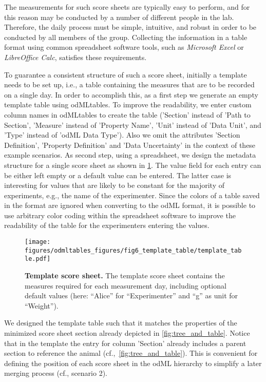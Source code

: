 The measurements for such score sheets are typically easy to perform, and for this reason may be conducted by a number of different people in the lab. Therefore, the daily process must be simple, intuitive, and robust in order to be conducted by all members of the group. Collecting the information in a table format using common spreadsheet software tools, such as \textit{Microsoft Excel} or \textit{LibreOffice Calc}, satisfies these requirements. 

To guarantee a consistent structure of such a score sheet, initially a template needs to be set up, i.e., a table containing the measures that are to be recorded on a single day. In order to accomplish this, as a first step we generate an empty template table using odMLtables. To improve the readability, we enter custom column names in odMLtables to create the table ('Section' instead of 'Path to Section', 'Measure' instead of 'Property Name', 'Unit' instead of 'Data Unit', and 'Type' instead of 'odML Data Type'). Also we omit the attributes 'Section Definition', 'Property Definition' and 'Data Uncertainty' in the context of these example scenarios. As second step, using a spreadsheet, we design the metadata structure for a single score sheet as shown in \cref{fig:template_table}. The value field for each entry can be either left empty or a default value can be entered. The latter case is interesting for values that are likely to be constant for the majority of experiments, e.g., the name of the experimenter. Since the colors of a table saved in the  format are ignored when converting to the odML format, it is possible to use arbitrary color coding within the spreadsheet software to improve the readability of the table for the experimenters entering the values.

\begin{figure}[!ht]
\begin{center}
\texttt{[image: figures/odmltables\_figures/fig6\_template\_table/template\_table.pdf]}
\caption[Template score sheet]{\label{fig:template_table}
\textbf{Template score sheet.} The template score sheet contains the measures required for each measurement day, including optional default values (here: ``Alice'' for ``Experimenter'' and ``g'' as unit for ``Weight'').}
\end{center}
\end{figure}

We designed the template table such that it matches the properties of the minimized score sheet section already depicted in \cref{fig:tree_and_table}. Notice that in the template the entry for column 'Section' already includes a parent section to reference the animal (cf.,~\cref{fig:tree_and_table}). This is convenient for defining the position of each score sheet in the odML hierarchy to simplify a later merging process (cf., scenario 2).

